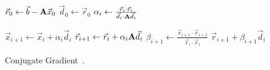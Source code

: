 \begin{algorithm}[tb]
	\begin{algorithmic}
		\STATE \(\vec{r}_0 \gets \vec{b} - \mathbf{A}\vec{x}_0\)
		\STATE \(\vec{d}_0 \gets \vec{r}_0\)
			\STATE \(\alpha_i \gets \frac{\vec{r}_i\cdot\vec{r}_i}{\vec{d}_i\cdot \mathbf{A}\vec{d}_i}\)
			
			\STATE \(\vec{x}_{i+1} \gets \vec{x}_i + \alpha_i\vec{d}_i\)
			\STATE \(\vec{r}_{i+1} \gets \vec{r}_i + \alpha_i\mathbf{A}\vec{d}_i\)
			\STATE \(\beta_{i+1} \gets \frac{\vec{r}_{i+1}\cdot\vec{r}_{i+1}}{\vec{r}_i\cdot\vec{r}_i}\)
			\STATE \(\vec{r}_{i+1} + \beta_{i+1}\vec{d}_i\)
		\ENDFOR
	\end{algorithmic}
	
	\caption{Conjugate Gradient~\cite{Saad:2003:IterativeMethods}.}
	\label{alg:bg-cg-alg-cg}
\end{algorithm}


